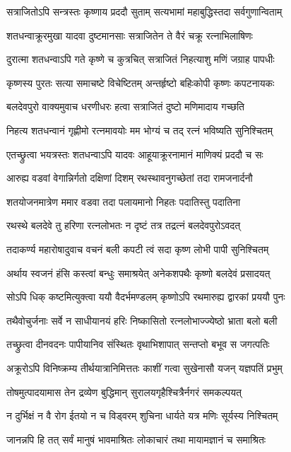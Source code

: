 \twolineshloka
{सत्राजितोऽपि सन्त्रस्तः कृष्णाय प्रददौ सुताम्}
{सत्यभामां महाबुद्धिस्तदा सर्वगुणान्विताम्}%

\twolineshloka
{शतधन्वाक्रूरमुखा यादवा दुष्टमानसाः}
{सत्राजितेन ते वैरं चक्रू रत्नाभिलाषिणः}%

\twolineshloka
{दुरात्मा शतधन्वाऽपि गते कृष्णे च कुत्रचित्}
{सत्राजितं निहत्याशु मणिं जग्राह पापधीः}%

\twolineshloka
{कृष्णस्य पुरतः सत्या समाचष्टे विचेष्टितम्}
{अन्तर्हृष्टो बहिःकोपी कृष्णः कपटनायकः}%

\twolineshloka
{बलदेवपुरो वाक्यमुवाच धरणीधरः}
{हत्वा सत्राजितं दुष्टो मणिमादाय गच्छति}%

\twolineshloka
{निहत्य शतधन्वानं गृह्णीमो रत्नमावयोः}
{मम भोग्यं च तद् रत्नं भविष्यति सुनिश्चितम्}%

\twolineshloka
{एतच्छ्रुत्वा  भयत्रस्तः शतधन्वाऽपि यादवः}
{आहूयाक्रूरनामानं माणिक्यं प्रददौ च सः}%

\twolineshloka
{आरुह्य वडवां वेगान्निर्गतो दक्षिणां दिशम्}
{रथस्थावनुगच्छेतां तदा रामजनार्दनौ}%

\twolineshloka
{शतयोजनमात्रेण ममार वडवा तदा}
{पलायमानो निहतः पदातिस्तु पदातिना}%

\twolineshloka
{रथस्थे बलदेवे तु हरिणा रत्नलोभतः}
{न दृष्टं तत्र तद्रत्नं बलदेवपुरोऽवदत्}%

\twolineshloka
{तदाकर्ण्य महारोषादुवाच वचनं बली}
{कपटी त्वं सदा कृष्ण लोभी पापी सुनिश्चितम्}%

\twolineshloka
{अर्थाय स्वजनं हंसि कस्त्वां बन्धुः समाश्रयेत्}
{अनेकशपथैः कृष्णो बलदेवं प्रसादयत्}%

\twolineshloka
{सोऽपि धिक् कष्टमित्युक्त्वा ययौ वैदर्भमण्डलम्}
{कृष्णोऽपि रथमारुह्य द्वारकां प्रययौ पुनः}%

\twolineshloka
{तथैवोचुर्जनाः सर्वे न साधीयानयं हरिः}
{निष्कासितो रत्नलोभाज्ज्येष्ठो भ्राता बलो बली}%

\twolineshloka
{तच्छ्रुत्वा दीनवदनः पापीयानिव संस्थितः}
{वृथाभिशापात् सन्तप्तो बभूव स जगत्पतिः}%

\twolineshloka
{अक्रूरोऽपि विनिष्क्रम्य तीर्थयात्रानिमित्ततः}
{काशीं गत्वा सुखेनासौ यजन् यज्ञपतिं प्रभुम्}%

\twolineshloka
{तोषमुत्पादयामास तेन द्रव्येण बुद्धिमान्}
{सुरालयगृहैश्चित्रैर्नगरं समकल्पयत्}%

\twolineshloka
{न दुर्भिक्षं न वै रोग ईतयो न च विड्वरम्}
{शुचिना धार्यते यत्र मणिः सूर्यस्य निश्चितम्}%

\twolineshloka
{जानन्नपि हि तत् सर्वं मानुषं भावमाश्रितः}
{लोकाचारं तथा मायामज्ञानं च समाश्रितः}%

